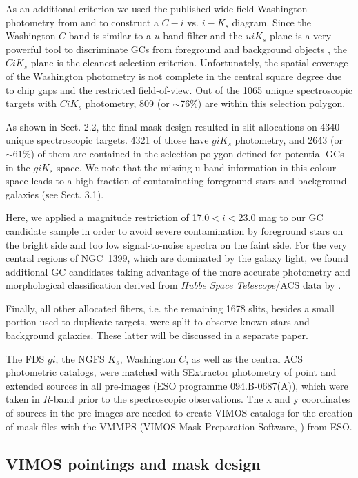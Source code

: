 \documentclass[useAMS,usenatbib]{mn2e}
\begin{document}
As an additional criterion we used the published wide-field Washington 
photometry from \citet{Dirsch04} and \citet{Bassino} to construct a $C-i$ vs. 
$i-K_s$ diagram. Since the Washington $C$-band is similar to a $u$-band filter 
and the $uiK_s$ plane is a very powerful tool to discriminate GCs from 
foreground and background objects \citep{Munoz14}, the $CiK_s$ plane is the 
cleanest selection criterion. Unfortunately, the spatial coverage of the 
Washington photometry is not complete in the central square degree due to chip 
gaps and the restricted field-of-view. Out of the 1065 unique spectroscopic 
targets with $CiK_s$ photometry, 809 (or $\sim$76\%) are within this selection 
polygon.

As shown in Sect. 2.2, the final 
mask design resulted in slit allocations on 4340 unique spectroscopic targets. 
4321 of those have $giK_s$ photometry, and 2643 (or $\sim61$\%) of them are 
contained in the selection polygon defined for potential GCs in the $giK_s$ space. 
We note that the missing u-band information in this colour space leads to a 
high fraction of contaminating foreground stars and background galaxies (see Sect. 3.1).

Here, we applied a magnitude restriction of 17.0$<i<$23.0 mag to our GC 
candidate sample in order to avoid severe contamination by foreground stars on 
the bright side and too low signal-to-noise spectra on the faint side. 
For the very central regions of NGC~1399, which are dominated by the galaxy 
light, we found additional GC candidates taking advantage of the more accurate 
photometry and morphological classification derived from {\it Hubbe Space 
Telescope}/ACS data by \citet{Puzia14}.

Finally, all other allocated fibers, i.e. the remaining 1678 slits, besides a 
small portion used to duplicate targets, were split to observe known stars and 
background galaxies. These latter will be discussed in a separate paper. 

The FDS $gi$, the NGFS $K_s$, Washington $C$, as well as the central ACS  
photometric catalogs, were matched with SExtractor photometry of point and 
extended sources in all pre-images (ESO programme 094.B-0687(A)), which were 
taken in $R$-band prior to the spectroscopic observations. The x and y 
coordinates of sources in the pre-images are needed to create VIMOS catalogs 
for the creation of mask files with the VMMPS (VIMOS Mask Preparation 
Software, \citealt{Bottini05}) from ESO.

\subsection{VIMOS pointings and mask design}
\label{sec:VIMOSpointings}
\end{document}
